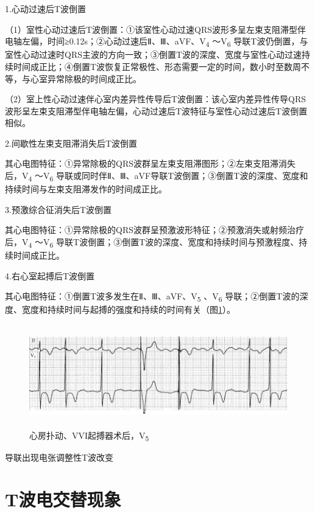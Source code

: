 1.心动过速后T波倒置

（1）室性心动过速后T波倒置：①该室性心动过速QRS波形多呈左束支阻滞型伴电轴左偏，时间≥0.12s；②心动过速后Ⅱ、Ⅲ、aVF、V\textsubscript{4}
～V\textsubscript{6}
导联T波仍倒置，与室性心动过速时QRS主波的方向一致；③倒置T波的深度、宽度与室性心动过速持续时间成正比；④倒置T波恢复正常极性、形态需要一定的时间，数小时至数周不等，与心室异常除极的时间成正比。

（2）室上性心动过速伴心室内差异性传导后T波倒置：该心室内差异性传导QRS波形呈左束支阻滞型伴电轴左偏，心动过速后T波特征与室性心动过速后T波倒置相似。

2.间歇性左束支阻滞消失后T波倒置

其心电图特征：①异常除极的QRS波群呈左束支阻滞图形；②左束支阻滞消失后，V\textsubscript{4}
～V\textsubscript{6}
导联或同时伴Ⅱ、Ⅲ、aVF导联T波倒置；③倒置T波的深度、宽度和持续时间与左束支阻滞发作的时间成正比。

3.预激综合征消失后T波倒置

其心电图特征：①异常除极的QRS波群呈预激波形特征；②预激消失或射频治疗后，V\textsubscript{4}
～V\textsubscript{6}
导联T波倒置；③倒置T波的深度、宽度和持续时间与预激程度、持续时间成正比。

4.右心室起搏后T波倒置

其心电图特征：①倒置T波多发生在Ⅱ、Ⅲ、aVF、V\textsubscript{5}
、V\textsubscript{6}
导联；②倒置T波的深度、宽度和持续时间与起搏的强度和持续的时间有关（图\ref{fig6-13}）。

\begin{figure}[!htbp]
 \centering
 \includegraphics[width=5.78125in,height=1.75in]{./images/Image00105.jpg}
 \captionsetup{justification=centering}
 \caption{心房扑动、VVI起搏器术后，V\textsubscript{5}}
 \label{fig6-13}
  \end{figure} 
导联出现电张调整性T波改变

\protect\hypertarget{text00012.htmlux5cux23subid96}{}{}

\section{T波电交替现象}

